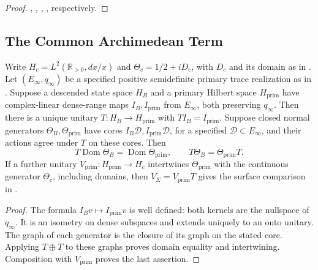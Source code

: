 \begin{proof}
,
,
,
,
 respectively.
\end{proof}

\subsection{The Common Archimedean Term}
\label{v4-arith:w10-a:common-residual}

\begin{theorem}
\label{v4-arith:w10-a:thm:common-residual}
Write \(H_c=L^2(\mathbb R_{>0},dx/x)\) and
\(\Theta_c=1/2+iD_c\), with \(D_c\) and its domain as in
.
Let \((E_\infty,q_\infty)\) be a specified positive semidefinite
primary trace realization as in
.
Suppose a descended state space \(H_B\) and a primary Hilbert space
\(H_{\mathrm{prim}}\) have complex-linear dense-range maps \(I_B,I_{\mathrm{prim}}\)
from \(E_\infty\), both preserving \(q_\infty\).
Then there is a unique unitary \(T:H_B\to H_{\mathrm{prim}}\)
with \(TI_B=I_{\mathrm{prim}}\).
Suppose closed normal generators \(\Theta_B,\Theta_{\mathrm{prim}}\)
have cores \(I_B\mathcal D,I_{\mathrm{prim}}\mathcal D\), for a
specified \(\mathcal D\subset E_\infty\), and their actions agree
under \(T\) on these cores. Then
\[
 T\operatorname{Dom}\Theta_B=\operatorname{Dom}\Theta_{\mathrm{prim}},
 \qquad T\Theta_B=\Theta_{\mathrm{prim}}T.
\]
If a further unitary \(V_{\mathrm{prim}}:H_{\mathrm{prim}}\to H_c\)
intertwines \(\Theta_{\mathrm{prim}}\) with the continuous generator
\(\Theta_c\), including domains, then
\(V_\Sigma=V_{\mathrm{prim}}T\) gives the surface comparison in
.
\end{theorem}
\begin{proof}
The formula \(I_Bv\mapsto I_{\mathrm{prim}}v\) is well defined:
both kernels are the nullspace of \(q_\infty\). It is an isometry
on dense subspaces and extends uniquely to an onto unitary.
The graph of each generator is the closure of its graph on the
stated core. Applying \(T\oplus T\) to these graphs proves domain
equality and intertwining. Composition with \(V_{\mathrm{prim}}\)
proves the last assertion.
\end{proof}

